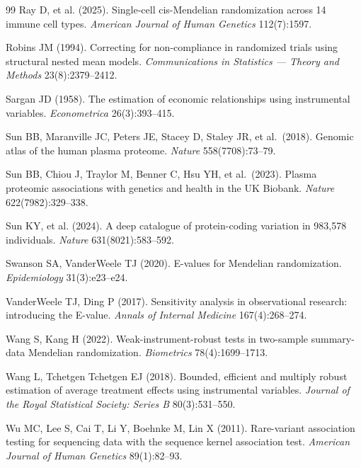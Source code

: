 \documentclass[11pt]{article}
\begin{document}
\begin{thebibliography}{99}
Ray D, et al. (2025). Single-cell cis-Mendelian randomization across 14 immune cell types. \emph{American Journal of Human Genetics} 112(7):1597.

Robins JM (1994). Correcting for non-compliance in randomized trials using structural nested mean models. \emph{Communications in Statistics --- Theory and Methods} 23(8):2379--2412.

Sargan JD (1958). The estimation of economic relationships using instrumental variables. \emph{Econometrica} 26(3):393--415.

Sun BB, Maranville JC, Peters JE, Stacey D, Staley JR, et al.\ (2018). Genomic atlas of the human plasma proteome. \emph{Nature} 558(7708):73--79.

Sun BB, Chiou J, Traylor M, Benner C, Hsu YH, et al.\ (2023). Plasma proteomic associations with genetics and health in the UK Biobank. \emph{Nature} 622(7982):329--338.

Sun KY, et al. (2024). A deep catalogue of protein-coding variation in 983{,}578 individuals. \emph{Nature} 631(8021):583--592.

Swanson SA, VanderWeele TJ (2020). E-values for Mendelian randomization. \emph{Epidemiology} 31(3):e23--e24.

VanderWeele TJ, Ding P (2017). Sensitivity analysis in observational research: introducing the E-value. \emph{Annals of Internal Medicine} 167(4):268--274.

Wang S, Kang H (2022). Weak-instrument-robust tests in two-sample summary-data Mendelian randomization. \emph{Biometrics} 78(4):1699--1713.

Wang L, Tchetgen Tchetgen EJ (2018). Bounded, efficient and multiply robust estimation of average treatment effects using instrumental variables. \emph{Journal of the Royal Statistical Society: Series B} 80(3):531--550.

Wu MC, Lee S, Cai T, Li Y, Boehnke M, Lin X (2011). Rare-variant association testing for sequencing data with the sequence kernel association test. \emph{American Journal of Human Genetics} 89(1):82--93.


\end{thebibliography}
\end{document}
